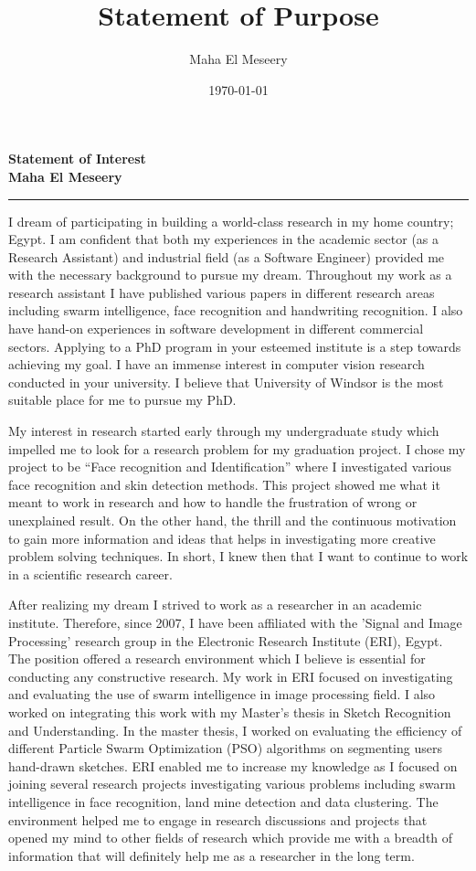 \documentclass[10pt]{article}%
\title{Statement of Purpose}
\author{Maha El Meseery }
\date{\today}
\begin{document}
\large
 \begin{center}
\textbf{ Statement of  Interest \\ Maha El Meseery } \hrule
\end{center}
\normalsize

I dream of participating in building a world-class research in my home country; Egypt. I am confident that both my experiences in the academic sector (as a Research Assistant) and industrial field (as a Software Engineer) provided me with the necessary background to pursue my dream. Throughout my work as a research assistant I have published various papers in different research areas including swarm intelligence, face recognition and handwriting recognition. I also have hand-on experiences in software development in different commercial sectors. Applying to a PhD program in your esteemed institute is a step towards achieving my goal. I have an immense interest in computer vision research conducted in your university. I believe that University of Windsor is the most suitable place for me to pursue my PhD.

 My interest in research started early through my undergraduate study which impelled me to look for a research problem for my graduation project. I chose my project to be ``Face recognition and Identification'' where I investigated various face recognition and skin detection methods. This project showed me what it meant to work in research and how to handle the frustration of wrong or unexplained result. On the other hand, the thrill and the continuous motivation to gain more information and ideas that helps in investigating more creative problem solving techniques. In short, I knew then that I want to continue to work in a scientific research career.


 After realizing my dream I strived to work as a researcher in an academic institute. Therefore, since 2007, I have been affiliated with the 'Signal and Image Processing' research group in the Electronic Research Institute (ERI), Egypt. The position offered a research environment which I believe is essential for conducting any constructive research. My work in ERI focused on investigating and evaluating the use of swarm intelligence in image processing field. I also worked on integrating this work with my Master's thesis in Sketch Recognition and Understanding. In the master thesis, I worked on evaluating the efficiency of different Particle Swarm Optimization (PSO) algorithms on segmenting users hand-drawn sketches. ERI enabled me to increase my knowledge as I focused on joining several research projects investigating various problems including swarm intelligence in face recognition, land mine detection and data clustering. The environment helped me to engage in research discussions and projects that opened my mind to other fields of research which provide me with a breadth of information that will definitely help me as a researcher in the long term.
\end{document}
